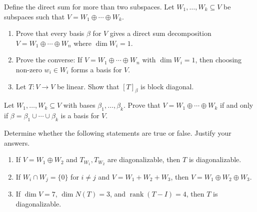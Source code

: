 \documentclass{eh-homework}
\begin{document}
    \begin{question}{9}
    Define the direct sum for more than two subspaces. Let $W_1, \ldots, W_k \subseteq V$ be subspaces such that $V = W_1 \oplus \cdots \oplus W_k$.
    
    \begin{enumerate}
        \item Prove that every basis $\beta$ for $V$ gives a direct sum decomposition $V = W_1 \oplus \cdots \oplus W_n$ where $\dim W_i = 1$.
        \item Prove the converse: If $V = W_1 \oplus \cdots \oplus W_n$ with $\dim W_i = 1$, then choosing non-zero $w_i \in W_i$ forms a basis for $V$.
        \item Let $T : V \to V$ be linear. Show that $[T]_\beta$ is block diagonal.
    \end{enumerate}
    \end{question}
    
    \begin{question}{10}
    Let $W_1, \ldots, W_k \subseteq V$ with bases $\beta_1, \ldots, \beta_k$. Prove that $V = W_1 \oplus \cdots \oplus W_k$ if and only if $\beta = \beta_1 \cup \cdots \cup \beta_k$ is a basis for $V$.
    \end{question}
    
    \begin{question}{11}
    Determine whether the following statements are true or false. Justify your answers.
    
    \begin{enumerate}
        \item If $V = W_1 \oplus W_2$ and $T_{W_1}, T_{W_2}$ are diagonalizable, then $T$ is diagonalizable.
        \item If $W_i \cap W_j = \{0\}$ for $i \neq j$ and $V = W_1 + W_2 + W_3$, then $V = W_1 \oplus W_2 \oplus W_3$.
        \item If $\dim V = 7$, $\dim N(T) = 3$, and $\operatorname{rank}(T - I) = 4$, then $T$ is diagonalizable.
    \end{enumerate}
    \end{question}
\end{document}

